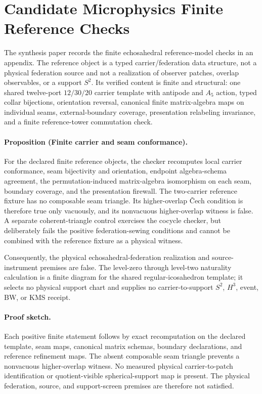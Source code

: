 \section{Candidate Microphysics Finite Reference Checks}

The synthesis paper records the finite echosahedral reference-model checks in an appendix. The
reference object is a typed carrier/federation data structure, not a physical federation source
and not a realization of observer patches, overlap observables, or a support \(S^2\). Its verified
content is finite and structural: one shared twelve-port \(12/30/20\) carrier template with
antipode and \(A_5\) action, typed collar bijections, orientation reversal, canonical finite
matrix-algebra maps on individual seams, external-boundary coverage, presentation relabeling
invariance, and a finite reference-tower commutation check.

\paragraph{Proposition (Finite carrier and seam conformance).}
For the declared finite reference objects, the checker recomputes local carrier conformance,
seam bijectivity and orientation, endpoint algebra-schema agreement, the permutation-induced
matrix-algebra isomorphism on each seam, boundary coverage, and the presentation firewall. The
two-carrier reference fixture has no composable seam triangle. Its higher-overlap \v{C}ech
condition is therefore true only vacuously, and its nonvacuous higher-overlap witness is false. A
separate coherent-triangle control exercises the cocycle checker, but deliberately fails the
positive federation-sewing conditions and cannot be combined with the reference fixture as a
physical witness.

Consequently, the physical echosahedral-federation realization and source-instrument premises
are false. The level-zero through level-two naturality calculation is a finite diagram for the
shared regular-icosahedron template; it selects no physical support chart and supplies no
carrier-to-support \(S^2\), \(H^3\), event, BW, or KMS receipt.

\paragraph{Proof sketch.}
Each positive finite statement follows by exact recomputation on the declared template, seam
maps, canonical matrix schemas, boundary declarations, and reference refinement maps. The absent
composable seam triangle prevents a nonvacuous higher-overlap witness. No measured physical
carrier-to-patch identification or quotient-visible spherical-support map is present. The
physical federation, source, and support-screen premises are therefore not satisfied.

